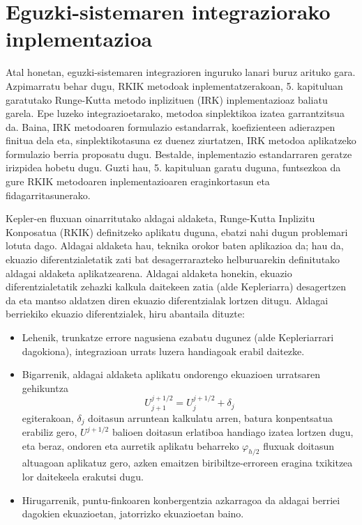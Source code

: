 \section*{Eguzki-sistemaren integraziorako inplementazioa}


Atal honetan, eguzki-sistemaren integrazioren inguruko lanari buruz arituko gara. Azpimarratu behar dugu, RKIK metodoak inplementatzerakoan, 5. kapituluan garatutako Runge-Kutta metodo inplizituen (IRK) inplementazioaz baliatu garela. Epe luzeko integrazioetarako, metodoa sinplektikoa izatea garrantzitsua da. Baina, IRK metodoaren formulazio estandarrak, koefizienteen adierazpen finitua dela eta,  sinplektikotasuna ez duenez ziurtatzen, IRK metodoa aplikatzeko formulazio berria proposatu dugu. Bestalde, inplementazio estandarraren geratze irizpidea hobetu dugu. Guzti hau, 5. kapituluan garatu duguna, funtsezkoa da gure RKIK metodoaren inplementazioaren eraginkortasun eta fidagarritasunerako.

Kepler-en fluxuan oinarritutako aldagai aldaketa, Runge-Kutta Inplizitu Konposatua (RKIK) definitzeko aplikatu duguna, ebatzi nahi dugun problemari lotuta dago. Aldagai aldaketa hau, teknika orokor baten aplikazioa da; hau da, ekuazio diferentzialetatik zati bat desagerrarazteko helburuarekin definitutako aldagai aldaketa aplikatzearena. Aldagai aldaketa honekin, ekuazio diferentzialetatik zehazki kalkula daitekeen zatia (alde Kepleriarra)  desagertzen da eta mantso aldatzen diren ekuazio diferentzialak lortzen ditugu.  Aldagai berriekiko ekuazio diferentzialek, hiru abantaila dituzte:
 \begin{itemize}
\item Lehenik, trunkatze errore nagusiena ezabatu dugunez (alde Kepleriarrari dagokiona), integrazioan urrats luzera handiagoak erabil daitezke.
\item Bigarrenik, aldagai aldaketa aplikatu ondorengo ekuazioen urratsaren gehikuntza
\begin{equation*}
 U^{j+1/2}_{j+1}=U^{j+1/2}_{j}+\delta_j
\end{equation*}
%
egiterakoan, $\delta_j$ doitasun arruntean kalkulatu arren, batura konpentsatua erabiliz gero, $U^{j+1/2}$ balioen doitasun erlatiboa handiago izatea lortzen dugu,
eta beraz, ondoren eta aurretik aplikatu beharreko $\varphi_{h/2}$ fluxuak doitasun altuagoan aplikatuz gero, azken emaitzen biribiltze-erroreen eragina txikitzea lor daitekeela erakutsi dugu.
\item Hirugarrenik, puntu-finkoaren konbergentzia azkarragoa da aldagai berriei dagokien ekuazioetan, jatorrizko ekuazioetan baino.
\end{itemize}

